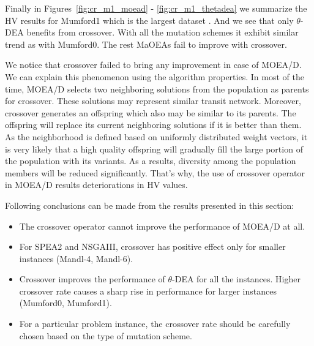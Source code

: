 Finally in Figures~\ref{fig:cr_m1_moead} - \ref{fig:cr_m1_thetadea} we summarize the HV results for Mumford1 which is the largest dataset . And we see that only $\theta$-DEA benefits from crossover. With all the mutation schemes it exhibit similar trend as with Mumford0. The rest MaOEAs fail to improve with crossover.

We notice that crossover failed to bring any improvement in case of MOEA/D. We can explain this phenomenon using the algorithm properties. In most of the time, MOEA/D selects two neighboring solutions from the population as parents for crossover. These solutions may represent similar transit network. Moreover, crossover generates an offspring which also may be similar to its parents. The offspring will replace its current neighboring solutions if it is better than them. As the neighborhood is defined based on uniformly distributed weight vectors, it is very likely that a high quality offspring will gradually fill the large portion of the population with its variants. As a results, diversity among the population members will be reduced significantly. That's why, the use of crossover operator in MOEA/D results deteriorations in HV values. 

Following conclusions can be made from the results presented in this section:
\begin{itemize}
	\item The crossover operator cannot improve the performance of MOEA/D at all.
	
	\item For SPEA2 and NSGAIII, crossover has positive effect only for smaller instances (Mandl-4, Mandl-6).
	
	\item Crossover improves the performance of $\theta$-DEA for all the instances. Higher crossover rate causes a sharp rise in performance for larger instances (Mumford0, Mumford1).
	
	\item For a particular problem instance, the crossover rate should be carefully chosen based on the type of mutation scheme.
\end{itemize}

